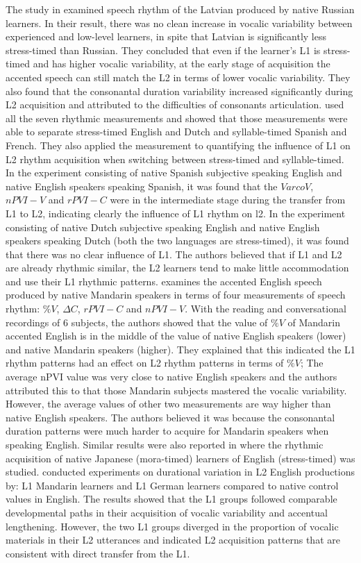 The study in \citep{stockmal2005measures} examined speech rhythm of the Latvian produced by native Russian learners. In their result, there was no clean increase in vocalic variability between experienced and low-level learners, in spite that Latvian is significantly less stress-timed than Russian. They concluded that even if the learner's L1 is stress-timed and has higher vocalic variability, at the early stage of acquisition the accented speech can still match the L2 in terms of lower vocalic variability. They also found that the consonantal duration variability increased significantly during L2 acquisition and attributed to the difficulties of consonants articulation. \cite{white2007calibrating} used all the seven rhythmic measurements and showed that those measurements were able to separate stress-timed English and Dutch and syllable-timed Spanish and French. They also applied the measurement to quantifying the influence of L1 on L2 rhythm acquisition when switching between stress-timed and syllable-timed. In the experiment consisting of native Spanish subjective speaking English and native English speakers speaking Spanish, it was found that the $VarcoV$, $nPVI-V$ and $rPVI-C$ were in the intermediate stage during the transfer from L1 to L2, indicating clearly the influence of L1 rhythm on l2. In the experiment consisting of native Dutch subjective speaking English and native English speakers speaking Dutch (both the two languages are stress-timed), it was found that there was no clear influence of L1. The authors believed that if L1 and L2 are already rhythmic similar, the L2 learners tend to make little accommodation and use their L1 rhythmic patterns. \cite{lin2008interlanguage} examines the accented English speech produced by native Mandarin speakers in terms of four measurements of speech rhythm: $\%V$, $\Delta C$, $rPVI-C$ and $nPVI-V$. With the reading and conversational recordings of 6 subjects, the authors showed that the value of $\%V$ of Mandarin accented English is in the middle of the value of native English speakers (lower) and native Mandarin speakers (higher). They explained that this indicated the L1 rhythm patterns had an effect on L2 rhythm patterns in terms of $\%V$; The average nPVI value was very close to native English speakers and the authors attributed this to that those Mandarin subjects mastered the vocalic variability. However, the average values of other two measurements are way higher than native English speakers. The authors believed it was because the consonantal duration patterns were much harder to acquire for Mandarin speakers when speaking English. Similar results were also reported in \citep{kawase2016influence} where the rhythmic acquisition of native Japanese (mora-timed) learners of English (stress-timed) was studied. \cite{li2014l2} conducted experiments on durational variation in L2 English productions by: L1 Mandarin learners and L1 German learners compared to native control values in English. The results showed that the L1 groups followed comparable developmental paths in their acquisition of vocalic variability and accentual lengthening. However, the two L1 groups diverged in the proportion of vocalic materials in their L2 utterances and indicated L2 acquisition patterns that are consistent with direct transfer from the L1. 